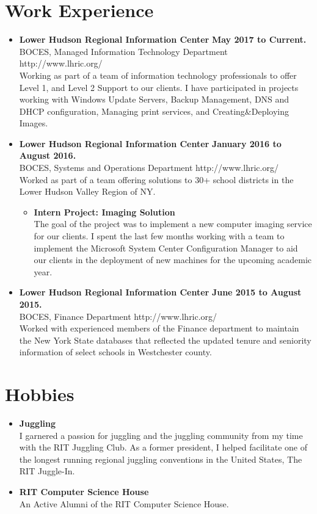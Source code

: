 \documentclass[10pt]{Article}
\begin{document}
\section*{Work Experience}
\begin{itemize}[topsep=1ex, itemsep=.5ex, parsep=0ex, partopsep=.75ex]
	\item[]{{\bf Lower Hudson Regional Information Center} \hfill {\bf May 2017 to Current.}}\\
	BOCES, Managed Information Technology Department \hfill http://www.lhric.org/\\
	Working as part of a team of information technology professionals to offer Level 1, and Level 2 Support to our clients.
	I have participated in projects working with Windows Update Servers, Backup Management, DNS and DHCP configuration, Managing print services, and Creating\&Deploying Images.
	\item[]{{\bf Lower Hudson Regional Information Center} \hfill {\bf January 2016 to August 2016.}}\\
	BOCES, Systems and Operations Department \hfill http://www.lhric.org/\\
	Worked as part of a team offering solutions to 30+ school districts in the Lower Hudson Valley Region of NY.
	\begin{itemize}[topsep=1ex, itemsep=.5ex, parsep=0ex, partopsep=.75ex]
		\item[]{\bf Intern Project: Imaging Solution}\\
		The goal of the project was to implement a new computer imaging service for our clients. I spent the last few months working with a team to implement the Microsoft System Center Configuration Manager to aid our clients in the deployment of new machines for the upcoming academic year.
	\end{itemize}
	\item[]{{\bf Lower Hudson Regional Information Center} \hfill {\bf June 2015 to August 2015.}}\\
	BOCES, Finance Department \hfill http://www.lhric.org/\\
	Worked with experienced members of the Finance department to maintain the New York
	State databases that reflected the updated tenure and seniority information of select schools in Westchester county.
\end{itemize}

\section*{Hobbies}
\begin{itemize}[topsep=1ex, itemsep=.5ex, parsep=0ex, partopsep=.75ex]
	\item[]{\bf Juggling}\\
	I garnered a passion for juggling and the juggling community from my time with the RIT Juggling Club. As a former president, I helped facilitate one of the longest running regional juggling conventions in the United States, The RIT Juggle-In.

	\item[]{\bf RIT Computer Science House}\\
	An Active Alumni of the RIT Computer Science House.
\end{itemize}
\end{document}
